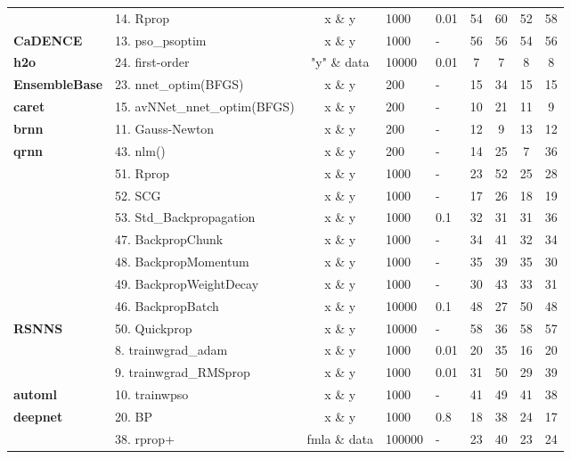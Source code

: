 \begin{Schunk}
\begin{table}[!h]
\begin{tabular}[t]{>{}llcllcccc}
 & 14. Rprop & x \& y & 1000 & 0.01 & 54 & 60 & 52 & 58\\

\multirow{-3}{*}{\raggedright\arraybackslash \textbf{CaDENCE}} & 13. pso\_psoptim & x \& y & 1000 & - & 56 & 56 & 54 & 56\\
\cmidrule{1-9}
\textbf{h2o} & 24. first-order & "y" \& data & 10000 & 0.01 & 7 & 7 & 8 & 8\\
\cmidrule{1-9}
\textbf{EnsembleBase} & 23. nnet\_optim(BFGS) & x \& y & 200 & - & 15 & 34 & 15 & 15\\
\cmidrule{1-9}
\textbf{caret} & 15. avNNet\_nnet\_optim(BFGS) & x \& y & 200 & - & 10 & 21 & 11 & 9\\
\cmidrule{1-9}
\textbf{brnn} & 11. Gauss-Newton & x \& y & 200 & - & 12 & 9 & 13 & 12\\
\cmidrule{1-9}
\textbf{qrnn} & 43. nlm() & x \& y & 200 & - & 14 & 25 & 7 & 36\\
\cmidrule{1-9}
 & 51. Rprop & x \& y & 1000 & - & 23 & 52 & 25 & 28\\

 & 52. SCG & x \& y & 1000 & - & 17 & 26 & 18 & 19\\

 & 53. Std\_Backpropagation & x \& y & 1000 & 0.1 & 32 & 31 & 31 & 36\\

 & 47. BackpropChunk & x \& y & 1000 & - & 34 & 41 & 32 & 34\\

 & 48. BackpropMomentum & x \& y & 1000 & - & 35 & 39 & 35 & 30\\

 & 49. BackpropWeightDecay & x \& y & 1000 & - & 30 & 43 & 33 & 31\\

 & 46. BackpropBatch & x \& y & 10000 & 0.1 & 48 & 27 & 50 & 48\\

\multirow{-8}{*}{\raggedright\arraybackslash \textbf{RSNNS}} & 50. Quickprop & x \& y & 10000 & - & 58 & 36 & 58 & 57\\
\cmidrule{1-9}
 & 8. trainwgrad\_adam & x \& y & 1000 & 0.01 & 20 & 35 & 16 & 20\\

 & 9. trainwgrad\_RMSprop & x \& y & 1000 & 0.01 & 31 & 50 & 29 & 39\\

\multirow{-3}{*}{\raggedright\arraybackslash \textbf{automl}} & 10. trainwpso & x \& y & 1000 & - & 41 & 49 & 41 & 38\\
\cmidrule{1-9}
\textbf{deepnet} & 20. BP & x \& y & 1000 & 0.8 & 18 & 38 & 24 & 17\\
\cmidrule{1-9}
 & 38. rprop+ & fmla \& data & 100000 & - & 23 & 40 & 23 & 24\\


\end{tabular}
\end{table}
\end{Schunk}

